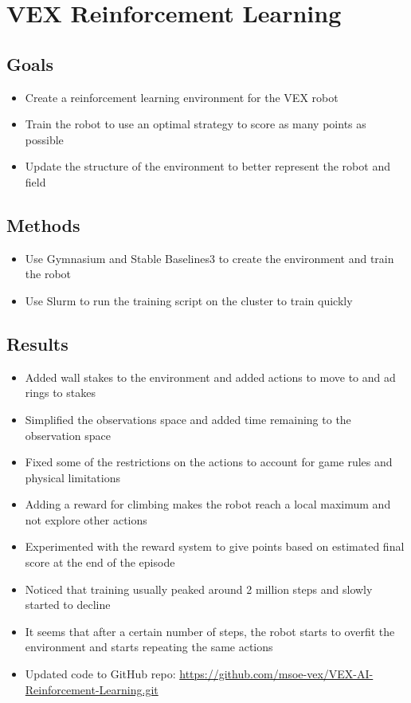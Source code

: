 \section{VEX Reinforcement Learning}

\subsection{Goals}
\begin{itemize}
    \item Create a reinforcement learning environment for the VEX robot
    \item Train the robot to use an optimal strategy to score as many points as possible
    \item Update the structure of the environment to better represent the robot and field
\end{itemize}

\subsection{Methods}
\begin{itemize}
    \item Use Gymnasium and Stable Baselines3 to create the environment and train the robot
    \item Use Slurm to run the training script on the cluster to train quickly
\end{itemize}

\subsection{Results}
\begin{itemize}
    \item Added wall stakes to the environment and added actions to move to and ad rings to stakes
    \item Simplified the observations space and added time remaining to the observation space
    \item Fixed some of the restrictions on the actions to account for game rules and physical limitations
    \item Adding a reward for climbing makes the robot reach a local maximum and not explore other actions
    \item Experimented with the reward system to give points based on estimated final score at the end of the episode
    \item Noticed that training usually peaked around 2 million steps and slowly started to decline
    \item It seems that after a certain number of steps, the robot starts to overfit the environment and starts repeating the same actions
    \item Updated code to GitHub repo: \href{https://github.com/msoe-vex/VEX-AI-Reinforcement-Learning.git}{https://github.com/msoe-vex/VEX-AI-Reinforcement-Learning.git}
\end{itemize}

